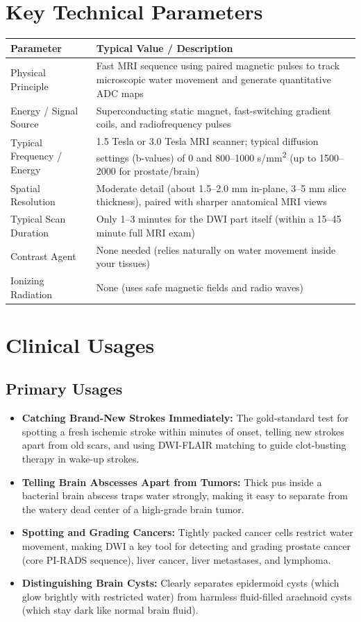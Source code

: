 \section{Key Technical Parameters}
\noindent
\begin{tabularx}{\textwidth}{@{}l X@{}}
\toprule
\textbf{Parameter} & \textbf{Typical Value / Description} \\
\midrule
Physical Principle & Fast MRI sequence using paired magnetic pulses to track microscopic water movement and generate quantitative ADC maps \\
Energy / Signal Source & Superconducting static magnet, fast-switching gradient coils, and radiofrequency pulses \\
Typical Frequency / Energy & 1.5 Tesla or 3.0 Tesla MRI scanner; typical diffusion settings (b-values) of 0 and 800--1000 s/mm\textsuperscript{2} (up to 1500--2000 for prostate/brain) \\
Spatial Resolution & Moderate detail (about 1.5--2.0 mm in-plane, 3--5 mm slice thickness), paired with sharper anatomical MRI views \\
Typical Scan Duration & Only 1--3 minutes for the DWI part itself (within a 15--45 minute full MRI exam) \\
Contrast Agent & None needed (relies naturally on water movement inside your tissues) \\
Ionizing Radiation & None (uses safe magnetic fields and radio waves) \\
\bottomrule
\end{tabularx}

\section{Clinical Usages}

\subsection{Primary Usages}
\begin{itemize}
\item \textbf{Catching Brand-New Strokes Immediately:} The gold-standard test for spotting a fresh ischemic stroke within minutes of onset, telling new strokes apart from old scars, and using DWI-FLAIR matching to guide clot-busting therapy in wake-up strokes.
\item \textbf{Telling Brain Abscesses Apart from Tumors:} Thick pus inside a bacterial brain abscess traps water strongly, making it easy to separate from the watery dead center of a high-grade brain tumor.
\item \textbf{Spotting and Grading Cancers:} Tightly packed cancer cells restrict water movement, making DWI a key tool for detecting and grading prostate cancer (core PI-RADS sequence), liver cancer, liver metastases, and lymphoma.
\item \textbf{Distinguishing Brain Cysts:} Clearly separates epidermoid cysts (which glow brightly with restricted water) from harmless fluid-filled arachnoid cysts (which stay dark like normal brain fluid).
\end{itemize}

